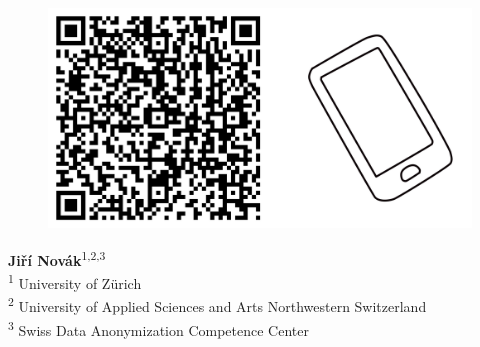 \documentclass[a0,portrait]{a0poster}
\begin{document}
\begin{figure}[h]
\begin{minipage}{.15\linewidth}
\end{minipage}
\hspace{\fill} %
\begin{minipage}{.24\linewidth}
  \includegraphics[width=1\linewidth]{Poster TEX/style/qr-code.png}
  
\end{minipage}
\end{figure}

\begin{minipage}[t]{.7\linewidth}
\vfill
\makeatletter
\raggedright{\fontsize{130pt}{100pt}\selectfont\color{uzhblau100}\textbf{{\@title}}\par}
\makeatother
\color{Black}
\vspace{1cm}
\end{minipage}
\begin{minipage}[t]{.3\linewidth}
\vfill
\raggedleft
\large
\textbf{Jiří Novák}\textsuperscript{1,2,3} \\
\vspace{0.2cm}
\large
\textsuperscript{1} University of Zürich \\
\textsuperscript{2} University of Applied Sciences and Arts Northwestern Switzerland  \\
\textsuperscript{3} Swiss Data Anonymization Competence Center
\end{minipage}
\end{document}
